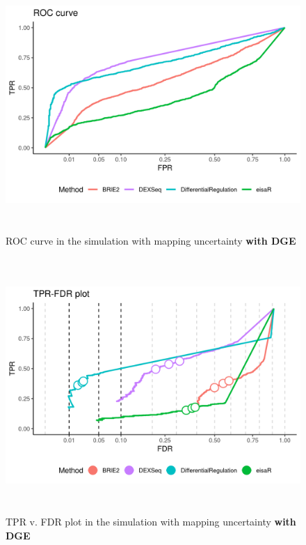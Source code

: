 \begin{figure}[!htb]
\begin{center}
\includegraphics[width=6in,height=3.8in]{../figures/simulation/minnow_simulation_DGE_ROC.png}
\end{center}
\caption{ROC curve in the simulation with mapping uncertainty \textbf{with DGE}}
\label{fig:soph_sim_DGE_ROC}
\end{figure}

\begin{figure}[!htb]
\begin{center}
\includegraphics[width=6in,height=3.8in]{../figures/simulation/minnow_simulation_DGE_FDR.png}
\end{center}
\caption{TPR v. FDR plot in the simulation with mapping uncertainty \textbf{with DGE}}
\label{fig:soph_sim_DGE_FDR}
\end{figure}

